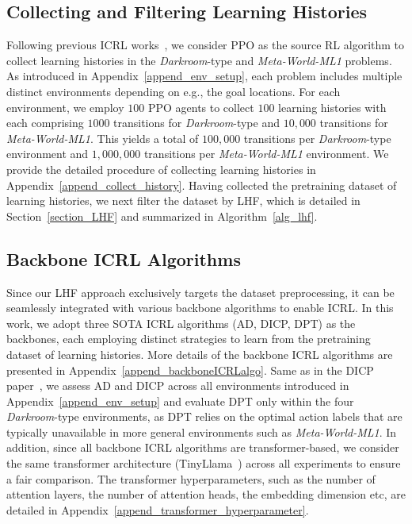 \documentclass{article}
\begin{document}
\subsection{Collecting and Filtering Learning Histories}
\label{subsec_collect_filter_hist}

Following previous ICRL works~\cite{laskin2022context, son2025distilling}, we consider PPO as the source RL algorithm to collect learning histories in the \textit{Darkroom}-type and \textit{Meta-World-ML1} problems. As introduced in Appendix~\ref{append_env_setup}, each problem includes multiple distinct environments depending on e.g., the goal locations. For each environment, we employ $100$ PPO agents to collect $100$ learning histories with each comprising $1000$ transitions for \textit{Darkroom}-type and $10,000$ transitions for \textit{Meta-World-ML1}. This yields a total of $100,000$ transitions per \textit{Darkroom}-type environment and $1,000,000$ transitions per \textit{Meta-World-ML1} environment. We provide the detailed procedure of collecting learning histories in Appendix~\ref{append_collect_history}.
%
%
Having collected the pretraining dataset of learning histories, we next filter the dataset by LHF, which is detailed in Section~\ref{section_LHF} and summarized in Algorithm~\ref{alg_lhf}.






\subsection{Backbone ICRL Algorithms}


Since our LHF approach exclusively targets the dataset preprocessing, it can be seamlessly integrated with various backbone algorithms to enable ICRL.
%
In this work, we adopt three SOTA ICRL algorithms (AD, DICP, DPT) as the backbones, each employing distinct strategies to learn from the pretraining dataset of learning histories. More details of the backbone ICRL algorithms are presented in Appendix~\ref{append_backboneICRLalgo}.
%
%
Same as in the DICP paper~\cite{son2025distilling}, we assess AD and DICP across all environments introduced in Appendix~\ref{append_env_setup} and evaluate DPT only within the four \textit{Darkroom}-type environments, as DPT relies on the optimal action labels that are typically unavailable in more general environments such as \textit{Meta-World-ML1}.
%
%
In addition, since all backbone ICRL algorithms are transformer-based, we consider the same transformer architecture (TinyLlama~\cite{zhang2024tinyllama}) across all experiments to ensure a fair comparison. The transformer hyperparameters, such as the number of attention layers, the number of attention heads, the embedding dimension etc, are detailed in Appendix~\ref{append_transformer_hyperparameter}.
\end{document}
